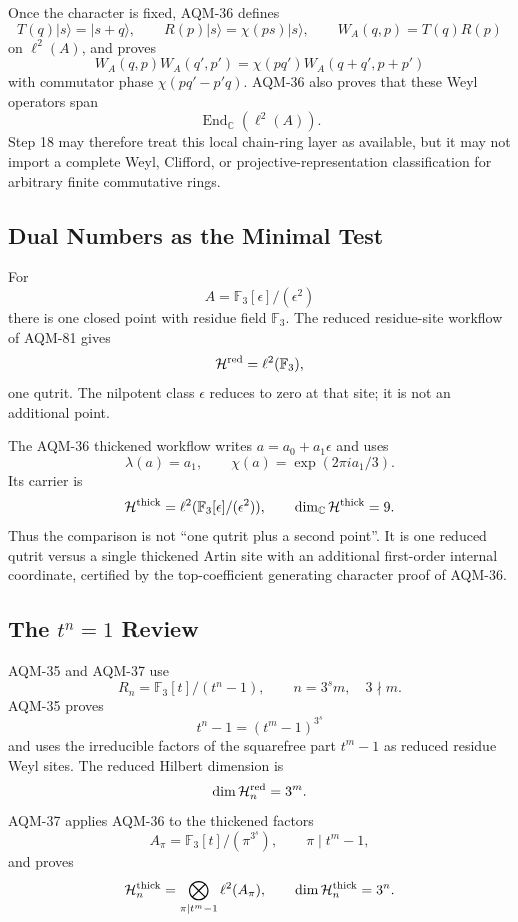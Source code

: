 Once the character is fixed, AQM-36 defines
\[
  T(q)|s\rangle=|s+q\rangle,\qquad
  R(p)|s\rangle=\chi(ps)|s\rangle,\qquad
  W_A(q,p)=T(q)R(p)
\]
on \(\ell^2(A)\), and proves
\[
  W_A(q,p)W_A(q',p')=\chi(pq')W_A(q+q',p+p')
\]
with commutator phase \(\chi(pq'-p'q)\).  AQM-36 also proves that these Weyl
operators span
\[
  \operatorname{End}_{\mathbb C}(\ell^2(A)).
\]
Step 18 may therefore treat this local chain-ring layer as available, but it
may not import a complete Weyl, Clifford, or projective-representation
classification for arbitrary finite commutative rings.

\subsection{Dual Numbers as the Minimal Test}

For
\[
  A=\mathbb F_3[\epsilon]/(\epsilon^2)
\]
there is one closed point with residue field \(\mathbb F_3\).  The reduced
residue-site workflow of AQM-81 gives
\[
  \mathcal H^{\rm red}=\ell^2(\mathbb F_3),
\]
one qutrit.  The nilpotent class \(\epsilon\) reduces to zero at that site;
it is not an additional point.

The AQM-36 thickened workflow writes \(a=a_0+a_1\epsilon\) and uses
\[
  \lambda(a)=a_1,\qquad
  \chi(a)=\exp(2\pi i a_1/3).
\]
Its carrier is
\[
  \mathcal H^{\rm thick}
    =\ell^2(\mathbb F_3[\epsilon]/(\epsilon^2)),
  \qquad \dim_{\mathbb C}\mathcal H^{\rm thick}=9.
\]
Thus the comparison is not ``one qutrit plus a second point''.  It is one
reduced qutrit versus a single thickened Artin site with an additional
first-order internal coordinate, certified by the top-coefficient generating
character proof of AQM-36.

\subsection{The \texorpdfstring{\(t^n=1\)}{t to the n equals 1} Review}

AQM-35 and AQM-37 use
\[
  R_n=\mathbb F_3[t]/(t^n-1),\qquad n=3^s m,\quad 3\nmid m.
\]
AQM-35 proves
\[
  t^n-1=(t^m-1)^{3^s}
\]
and uses the irreducible factors of the squarefree part \(t^m-1\) as reduced
residue Weyl sites.  The reduced Hilbert dimension is
\[
  \dim\mathcal H_n^{\rm red}=3^m.
\]
AQM-37 applies AQM-36 to the thickened factors
\[
  A_\pi=\mathbb F_3[t]/(\pi^{3^s}),\qquad \pi\mid t^m-1,
\]
and proves
\[
  \mathcal H_n^{\rm thick}
    =\bigotimes_{\pi\mid t^m-1}\ell^2(A_\pi),
  \qquad
  \dim\mathcal H_n^{\rm thick}=3^n.
\]

